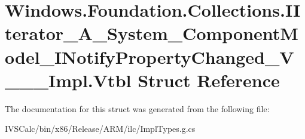 \hypertarget{struct_windows_1_1_foundation_1_1_collections_1_1_i_iterator___a___system___component_model___i_8f7fb33b4a2b390a859c372b0d93db3e}{}\section{Windows.\+Foundation.\+Collections.\+I\+Iterator\+\_\+\+A\+\_\+\+System\+\_\+\+Component\+Model\+\_\+\+I\+Notify\+Property\+Changed\+\_\+\+V\+\_\+\+\_\+\+\_\+\+Impl.\+Vtbl Struct Reference}
\label{struct_windows_1_1_foundation_1_1_collections_1_1_i_iterator___a___system___component_model___i_8f7fb33b4a2b390a859c372b0d93db3e}


The documentation for this struct was generated from the following file\+:\begin{DoxyCompactItemize}
\item 
I\+V\+S\+Calc/bin/x86/\+Release/\+A\+R\+M/ilc/Impl\+Types.\+g.\+cs\end{DoxyCompactItemize}
